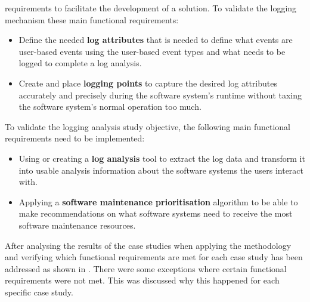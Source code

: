 \begin{enumerate}[label=\textbf{\Roman*.}]
	requirements to facilitate the development of a solution. To validate the logging mechanism
	these main functional requirements:
	 \begin{itemize}
		\item Define the needed \textbf{log attributes} that is needed to define what events are
		user-based events using the user-based event types and what needs to be logged to complete a
		log analysis.
		\item Create and place \textbf{logging points} to capture the desired log attributes
		accurately and precisely during the software system's runtime without taxing the software
		system's normal operation too much.
	 \end{itemize}

	 To validate the logging analysis study objective, the following main functional requirements
	 need to be implemented:
	 \begin{itemize}
		\item Using or creating a \textbf{log analysis} tool to extract the log data and transform
		it into usable analysis information about the software systems the users interact with.
		\item Applying a \textbf{software maintenance prioritisation} algorithm to be able to make
		recommendations on what software systems need to receive the most software maintenance
		resources.
	 \end{itemize}

	 After analysing the results of the case studies when applying the methodology and verifying
	 which functional requirements are met for each case study has been addressed as shown in
	 . There were some exceptions where certain functional
	 requirements were not met. This was discussed why this happened for each specific case study.
\end{enumerate}

